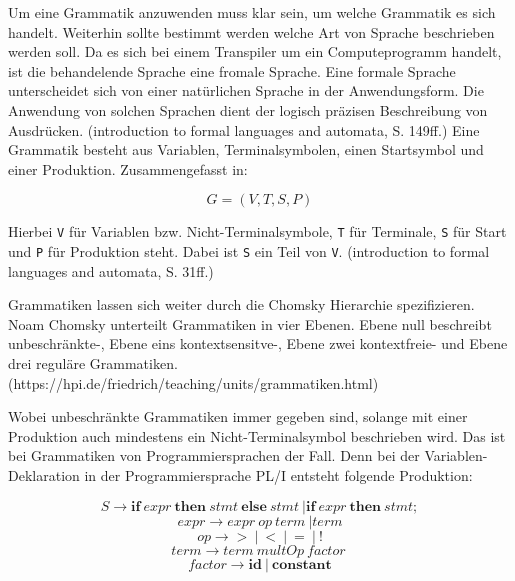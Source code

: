 Um eine Grammatik anzuwenden muss klar sein, um welche Grammatik es sich handelt. Weiterhin sollte bestimmt werden welche Art von Sprache beschrieben werden soll. 
Da es sich bei einem Transpiler um ein Computeprogramm handelt, ist die behandelende Sprache eine fromale Sprache. Eine formale Sprache unterscheidet sich von einer natürlichen Sprache in der Anwendungsform. Die Anwendung von solchen Sprachen dient der logisch präzisen Beschreibung von Ausdrücken. (introduction to formal languages and automata, S. 149ff.) Eine Grammatik besteht aus Variablen, Terminalsymbolen, einen Startsymbol und einer Produktion. Zusammengefasst in:

\begin{center}
\begin{equation}
G=(V,T,S,P)
\end{equation}
\end{center}

Hierbei \verb+V+ für Variablen bzw. Nicht-Terminalsymbole, \verb+T+ für Terminale, \verb+S+ für Start und \verb+P+ für Produktion steht. Dabei ist \verb+S+ ein Teil von \verb+V+. (introduction to formal languages and automata, S. 31ff.)


Grammatiken lassen sich weiter durch die Chomsky Hierarchie spezifizieren. Noam Chomsky unterteilt Grammatiken in vier Ebenen. Ebene null beschreibt unbeschränkte-, Ebene eins kontextsensitve-, Ebene zwei kontextfreie- und Ebene drei reguläre Grammatiken.(https://hpi.de/friedrich/teaching/units/grammatiken.html) 

\pagebreak

Wobei unbeschränkte Grammatiken immer gegeben sind, solange mit einer Produktion auch mindestens ein Nicht-Terminalsymbol beschrieben wird. Das ist bei Grammatiken von Programmiersprachen der Fall. Denn bei der Variablen-Deklaration in der Programmiersprache PL/I entsteht folgende Produktion:

\begin{center}
\begin{equation}
S \to \mathbf{if}\: expr\: \mathbf{then}\: stmt\: \mathbf{else}\: stmt\: | \mathbf{if}\: expr\: \mathbf{then}\: stmt;
\end{equation}
\begin{equation}
expr \to expr\: op\: term\: | term
\end{equation}
\begin{equation}
op \to \mathbf{>}\: |\: \mathbf{<}\: |\: \mathbf{=}\: |\: \mathbf{!}
\end{equation}
\begin{equation}
term \to term\: multOp\: factor\:
\end{equation}
\begin{equation}
factor \to \mathbf{id}\: |\: \mathbf{constant} 
\end{equation}
\end{center}
 
